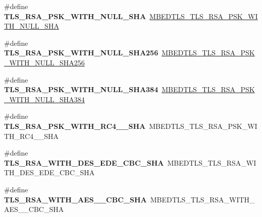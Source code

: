 \begin{DoxyCompactItemize}
\mbox{\label{compat-1_83_8h_a97af406e8dfe646bdd6f3a8c080c2ac6}} 
\#define {\bfseries T\+L\+S\+\_\+\+R\+S\+A\+\_\+\+P\+S\+K\+\_\+\+W\+I\+T\+H\+\_\+\+N\+U\+L\+L\+\_\+\+S\+HA}~\mbox{\hyperlink{ssl__ciphersuites_8h_a4d89c083d437714fafa9bafb82657026}{M\+B\+E\+D\+T\+L\+S\+\_\+\+T\+L\+S\+\_\+\+R\+S\+A\+\_\+\+P\+S\+K\+\_\+\+W\+I\+T\+H\+\_\+\+N\+U\+L\+L\+\_\+\+S\+HA}}
\item 
\mbox{\label{compat-1_83_8h_aadc35f48cf20e44b272cff7a20dfe415}} 
\#define {\bfseries T\+L\+S\+\_\+\+R\+S\+A\+\_\+\+P\+S\+K\+\_\+\+W\+I\+T\+H\+\_\+\+N\+U\+L\+L\+\_\+\+S\+H\+A256}~\mbox{\hyperlink{ssl__ciphersuites_8h_a36173bf1e36189d2def863d0a32610b3}{M\+B\+E\+D\+T\+L\+S\+\_\+\+T\+L\+S\+\_\+\+R\+S\+A\+\_\+\+P\+S\+K\+\_\+\+W\+I\+T\+H\+\_\+\+N\+U\+L\+L\+\_\+\+S\+H\+A256}}
\item 
\mbox{\label{compat-1_83_8h_a700ed898e7a9250651a61a6ffc5743c0}} 
\#define {\bfseries T\+L\+S\+\_\+\+R\+S\+A\+\_\+\+P\+S\+K\+\_\+\+W\+I\+T\+H\+\_\+\+N\+U\+L\+L\+\_\+\+S\+H\+A384}~\mbox{\hyperlink{ssl__ciphersuites_8h_a2e8b7ed448562687cd07add0b3acdb6f}{M\+B\+E\+D\+T\+L\+S\+\_\+\+T\+L\+S\+\_\+\+R\+S\+A\+\_\+\+P\+S\+K\+\_\+\+W\+I\+T\+H\+\_\+\+N\+U\+L\+L\+\_\+\+S\+H\+A384}}
\item 
\mbox{\label{compat-1_83_8h_a3aa6159150ee5dff96e861b87defdeb6}} 
\#define {\bfseries T\+L\+S\+\_\+\+R\+S\+A\+\_\+\+P\+S\+K\+\_\+\+W\+I\+T\+H\+\_\+\+R\+C4\+\_\+\_\+\+S\+HA}~M\+B\+E\+D\+T\+L\+S\+\_\+\+T\+L\+S\+\_\+\+R\+S\+A\+\_\+\+P\+S\+K\+\_\+\+W\+I\+T\+H\+\_\+\+R\+C4\+\_\+\_\+\+S\+HA
\item 
\mbox{\label{compat-1_83_8h_ae93cd5c8ebf49d2d1586e7d5f180cd78}} 
\#define {\bfseries T\+L\+S\+\_\+\+R\+S\+A\+\_\+\+W\+I\+T\+H\+\_\+D\+E\+S\+\_\+\+E\+D\+E\+\_\+\+C\+B\+C\+\_\+\+S\+HA}~M\+B\+E\+D\+T\+L\+S\+\_\+\+T\+L\+S\+\_\+\+R\+S\+A\+\_\+\+W\+I\+T\+H\+\_\+D\+E\+S\+\_\+\+E\+D\+E\+\_\+\+C\+B\+C\+\_\+\+S\+HA
\item 
\mbox{\label{compat-1_83_8h_a160e2286953c5ca7c436f2c9df205313}} 
\#define {\bfseries T\+L\+S\+\_\+\+R\+S\+A\+\_\+\+W\+I\+T\+H\+\_\+\+A\+E\+S\+\_\+\_\+\+C\+B\+C\+\_\+\+S\+HA}~M\+B\+E\+D\+T\+L\+S\+\_\+\+T\+L\+S\+\_\+\+R\+S\+A\+\_\+\+W\+I\+T\+H\+\_\+\+A\+E\+S\+\_\+\_\+\+C\+B\+C\+\_\+\+S\+HA

\end{DoxyCompactItemize}
